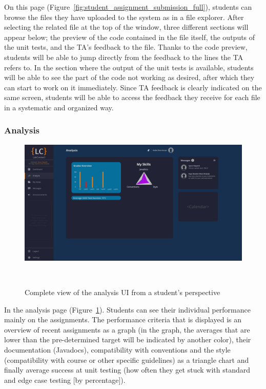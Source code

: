 \documentclass[a4paper, 12pt]{article}
\begin{document}
    On this page (Figure~\ref{fig:student_assignment_submission_full}), students can browse the files they have uploaded to the system as in a file explorer.
    After selecting the related file at the top of the window, three different sections will appear below; the preview of the code contained in the file itself,
    the outputs of the unit tests, and the TA's feedback to the file. Thanks to the code preview, students will be able to jump directly from the feedback
    to the lines the TA refers to. In the section where the output of the unit tests is available, students will be able to see the part of the code not
    working as desired, after which they can start to work on it immediately. Since TA feedback is clearly indicated on the same screen, students will be able to access the feedback they
    receive for each file in a systematic and organized way.

    \pagebreak

    \subsubsection{Analysis}

    \begin{figure}[H]
        \centering
        \includegraphics[width=\textwidth]{student_analysis}
        \caption{Complete view of the analysis UI from a student's perspective}~\label{fig:student_analysis_full}
    \end{figure}

    In the analysis page (Figure~\ref{fig:student_analysis_full}). Students can see their individual performance mainly on the assignments.
    The performance criteria that is displayed is an overview of recent assignments as a graph (in the graph, the averages that are lower than the
    pre-determined target will be indicated by another color), their documentation (Javadocs), compatibility with conventions and the style
    (compatibility with course or other specific guidelines) as a triangle chart and finally average success at unit testing (how often they
    get stuck with standard and edge case testing [by percentage]).
\end{document}
